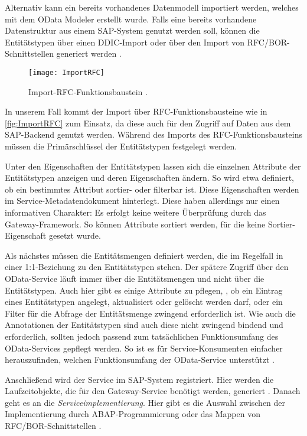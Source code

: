 Alternativ kann ein bereits vorhandenes Datenmodell importiert werden, welches \zB mit dem OData Modeler erstellt wurde. Falls eine bereits vorhandene Datenstruktur aus einem SAP-System genutzt werden soll, können die Entitätstypen über einen DDIC-Import oder über den Import von \ac{RFC}/\ac{BOR}-Schnittstellen generiert werden \cite[S.\ 194-195]{BoennenDreesFischerHeinzStrothmann2014}.

\begin{figure}[h]
	\centering
	\texttt{[image: ImportRFC]} 
	\caption[Import-RFC-Funktionsbaustein]{Import-RFC-Funktionsbaustein \cite[S.\ 45]{BoennenDreesFischerHeinzStrothmann2014}.}
	\label{fig:ImportRFC}
\end{figure}

In unserem Fall kommt der Import über RFC-Funktionsbausteine wie in \autoref{fig:ImportRFC} zum Einsatz, da diese auch für den Zugriff auf Daten aus dem SAP-Backend genutzt werden. Während des Imports des RFC-Funktionsbausteins müssen die Primärschlüssel der Entitätstypen festgelegt werden.

Unter den Eigenschaften der Entitätstypen lassen sich die einzelnen Attribute der Entitätstypen anzeigen und deren Eigenschaften ändern. So wird etwa definiert, ob ein bestimmtes Attribut sortier- oder filterbar ist. Diese Eigenschaften werden im Service-Metadatendokument hinterlegt. Diese haben allerdings nur einen informativen Charakter: Es erfolgt keine weitere Überprüfung durch das Gateway-Framework. So können Attribute sortiert werden, für die keine Sortier-Eigenschaft gesetzt wurde. 


Als nächstes müssen die Entitätsmengen definiert werden, die im Regelfall in einer 1:1-Beziehung zu den Entitätstypen stehen. Der spätere Zugriff über den OData-Service läuft immer über die Entitätsmengen und nicht über die Entitätstypen. Auch hier gibt es einige Attribute zu pflegen, \zB, ob ein Eintrag eines Entitätstypen angelegt, aktualisiert oder gelöscht werden darf, oder ein Filter für die Abfrage der Entitätsmenge zwingend erforderlich ist. Wie auch die Annotationen der Entitätstypen sind auch diese nicht zwingend bindend und erforderlich, sollten jedoch passend zum tatsächlichen Funktionsumfang des OData-Services gepflegt werden. So ist es für Service-Konsumenten einfacher herauszufinden, welchen Funktionsumfang der OData-Service unterstützt \cite[S.\ 237-240]{BoennenDreesFischerHeinzStrothmann2014}.


Anschließend wird der Service im SAP-System registriert. Hier werden die Laufzeitobjekte, die für den Gateway-Service benötigt werden, generiert \cite[S.\ 198]{BoennenDreesFischerHeinzStrothmann2014}.
Danach geht es an die \textit{Serviceimplementierung}. Hier gibt es die Auswahl zwischen der Implementierung durch ABAP-Programmierung  oder das Mappen von \ac{RFC}/\ac{BOR}-Schnittstellen \cite[S.\ 201-202]{BoennenDreesFischerHeinzStrothmann2014}.


